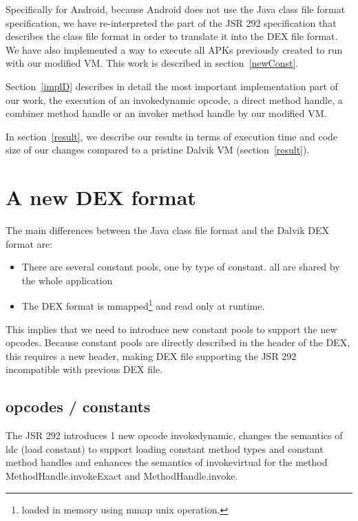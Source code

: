 \documentclass{sig-alternate}
\def \Jsr{JSR\xspace}
\def \JSR{\Jsr 292\xspace}
\def \ANDROID{Android\xspace}
\begin{document}
  Specifically for \ANDROID, because \ANDROID does not use the Java class file format specification,
  we have re-interpreted the part of the \JSR specification that describes the class file format
  in order to translate it into the DEX file format.
  We have also implemented a way to execute all APKs previously created to run with our modified VM.
  This work is described in section~\ref{newConst}.
  
  Section~\ref{implD} describes in detail the most important implementation part of our work,
  the execution of an invokedynamic opcode, a direct method handle, a combiner method handle or
  an invoker method handle by our modified VM.
  
  In section~\ref{result}, we describe our results in terms of execution time and code size of our changes
  compared to a pristine Dalvik VM (section~\ref{result}).\\

\section{A new DEX format}
\label{newDEX}

  The main differences between the Java class file format and the Dalvik DEX format are:
  \begin{itemize}
   \item There are several constant pools, one by type of constant.
         all are shared by the whole application
   \item The DEX format is mmapped\footnote{loaded in memory using mmap unix operation.}
    and read only at runtime.
  \end{itemize}
  
  This implies that we need to introduce new constant pools to support the new opcodes.
  Because constant pools are directly described in the header of the DEX,
  this requires a new header, making DEX file supporting the JSR 292 incompatible
  with previous DEX file.
  
  \subsection{opcodes / constants}
    The \JSR introduces 1 new opcode invokedynamic, changes the semantics of ldc (load constant)
    to support loading constant method types and constant method handles and enhances the semantics
    of invokevirtual for the method MethodHandle.invokeExact and MethodHandle.invoke.
\end{document}
